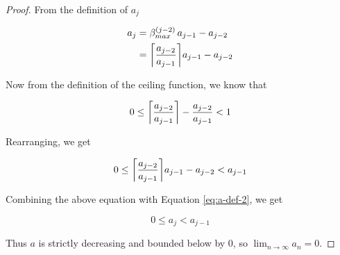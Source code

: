 \begin{proof}
	From the definition of $a_j$

	\begin{align}\label{eq:a-def-2}
		a_j& = \beta^{(j-2)}_{max} \, a_{j-1} - a_{j-2}\\
		& =  \ceil{\frac{a_{j-2}}{a_{j-1}}} a_{j-1} - a_{j-2}
	\end{align}

	Now from the definition of the ceiling function, we know that

	\begin{equation}
		0 \le \ceil{\frac{a_{j-2}}{a_{j-1}}} - \frac{a_{j-2}}{a_{j-1}} < 1
	\end{equation}

	Rearranging, we get

	\begin{equation}
		0 \le \ceil{\frac{a_{j-2}}{a_{j-1}}} a_{j-1} - a_{j-2} < a_{j-1}
	\end{equation}

	Combining the above equation with Equation \ref{eq:a-def-2}, we get

	\begin{equation}
		0 \le a_j < a_{j-1}
	\end{equation}

	Thus $a$ is strictly decreasing and bounded below by 0, so ${\displaystyle \lim_{n \to \infty} a_n = 0}$.
\end{proof}
